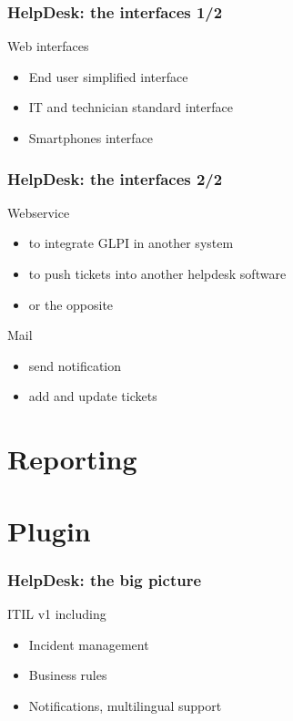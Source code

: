 \documentclass{beamer}
\begin{document}
\begin{frame}

    \frametitle{HelpDesk: the interfaces 1/2}

    \begin{block}{Web interfaces}
        \begin{itemize}
            \item End user simplified interface
            \item IT and technician standard interface
            \item Smartphones interface
        \end{itemize}
    \end{block}

\end{frame}
\begin{frame}

    \frametitle{HelpDesk: the interfaces 2/2}

    \begin{block}{Webservice}
        \begin{itemize}
            \item to integrate GLPI in another system
            \item to push tickets into another helpdesk software
            \item or the opposite
        \end{itemize}
    \end{block}

    \begin{block}{Mail}
       \begin{itemize}
            \item send notification
            \item add and update tickets
       \end{itemize}
    \end{block}


\end{frame}

\section{Reporting}

\section{Plugin}

\begin{frame}

    \frametitle{HelpDesk: the big picture}

    \begin{block}{ITIL v1 including}
        \begin{itemize}
            \item Incident management
            \item Business rules
            \item Notifications, multilingual support
        \end{itemize}
    \end{block}


\end{frame}
\end{document}
